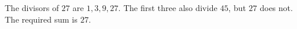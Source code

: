 The divisors of $27$ are $1,3,9,27$. The first three also divide $45$, but $27$ does not. The required sum is $\boxed{27}$.
